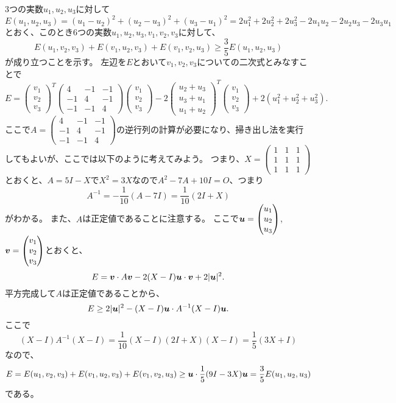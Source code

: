 \begin{example}
3つの実数$u_1, u_2, u_3$に対して
$$
E(u_1, u_2, u_3)
= (u_1-u_2)^2+(u_2-u_3)^2+(u_3-u_1)^2
= 2 u_1^2+2 u_2^2+2 u_3^2-2 u_1 u_2-2 u_2 u_3-2 u_3 u_1
$$
とおく、このとき6つの実数$u_1, u_2, u_3, v_1, v_2, v_3$に対して、
$$
E(u_1, v_2, v_3)+E(v_1, u_2, v_3)+E(v_1, v_2, u_3) \ge \frac{3}{5}E(u_1, u_2, u_3)
$$
が成り立つことを示す。
左辺を$E$とおいて$v_1, v_2, v_3$についての二次式とみなすことで
$$
E
= \begin{pmatrix}v_1 \\ v_2 \\ v_3\end{pmatrix}^T\begin{pmatrix}4 & -1 & -1 \\ -1 & 4 & -1 \\ -1 & -1 & 4\end{pmatrix}\begin{pmatrix}v_1 \\ v_2 \\ v_3\end{pmatrix}-2\begin{pmatrix}u_2+u_3 \\ u_3+u_1 \\ u_1+u_2\end{pmatrix}^T\begin{pmatrix}v_1 \\ v_2 \\ v_3\end{pmatrix}+2(u_1^2+u_2^2+u_3^2).
$$
ここで$A = \begin{pmatrix}4 & -1 & -1 \\ -1 & 4 & -1 \\ -1 & -1 & 4\end{pmatrix}$の逆行列の計算が必要になり、掃き出し法を実行してもよいが、ここでは以下のように考えてみよう。
つまり、$X = \begin{pmatrix}1 & 1 & 1 \\ 1 & 1 & 1 \\ 1 & 1 & 1\end{pmatrix}$とおくと、$A = 5 I-X$で$X^2 = 3 X$なので$A^2-7 A+10 I = O$、つまり
$$
A^{-1} = -\frac{1}{10}(A-7 I) = \frac{1}{10}(2 I+X)
$$
がわかる。
また、$A$は正定値であることに注意する。
ここで$\vb*{u} = \begin{pmatrix}u_1 \\ u_2 \\ u_3\end{pmatrix}$, $\vb*{v} = \begin{pmatrix}v_1 \\ v_2 \\ v_3\end{pmatrix}$とおくと、
$$
E = \vb*{v}\cdot A\vb*{v}-2(X-I)\vb*{u}\cdot\vb*{v}+2|\vb*{u}|^2.
$$
平方完成して$A$は正定値であることから、
$$
E \ge 2|\vb*{u}|^2-(X-I)\vb*{u}\cdot A^{-1}(X-I)\vb*{u}.
$$
ここで
$$
(X-I)A^{-1}(X-I) = \frac{1}{10}(X-I)(2 I+X)(X-I) = \frac{1}{5}(3 X+I)
$$
なので、
$$
E = E(u_1, v_2, v_3)+E(v_1, u_2, v_3)+E(v_1, v_2, u_3)
\ge \vb*{u}\cdot \frac{1}{5}(9 I-3 X)\vb*{u} = \frac{3}{5}E(u_1, u_2, u_3)
$$
である。
\end{example}
